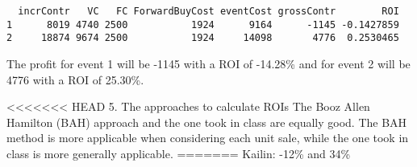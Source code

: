 \documentclass[]{article}
\newenvironment{Shaded}{\begin{snugshade}}{\end{snugshade}}
\newcommand{\DataTypeTok}[1]{\textcolor[rgb]{0.13,0.29,0.53}{#1}}
\newcommand{\DecValTok}[1]{\textcolor[rgb]{0.00,0.00,0.81}{#1}}
\newcommand{\KeywordTok}[1]{\textcolor[rgb]{0.13,0.29,0.53}{\textbf{#1}}}
\newcommand{\NormalTok}[1]{#1}
\newcommand{\OperatorTok}[1]{\textcolor[rgb]{0.81,0.36,0.00}{\textbf{#1}}}
\newcommand{\StringTok}[1]{\textcolor[rgb]{0.31,0.60,0.02}{#1}}
\begin{document}
\begin{Shaded}
\end{Shaded}

\begin{verbatim}
  incrContr   VC   FC ForwardBuyCost eventCost grossContr        ROI
1      8019 4740 2500           1924      9164      -1145 -0.1427859
2     18874 9674 2500           1924     14098       4776  0.2530465
\end{verbatim}

The profit for event 1 will be -1145 with a ROI of -14.28\% and for
event 2 will be 4776 with a ROI of 25.30\%.

\textless{}\textless{}\textless{}\textless{}\textless{}\textless{}\textless{}
HEAD 5. The approaches to calculate ROIs The Booz Allen Hamilton (BAH)
approach and the one took in class are equally good. The BAH method is
more applicable when considering each unit sale, while the one took in
class is more generally applicable. ======= Kailin: -12\% and 34\%
\end{document}
